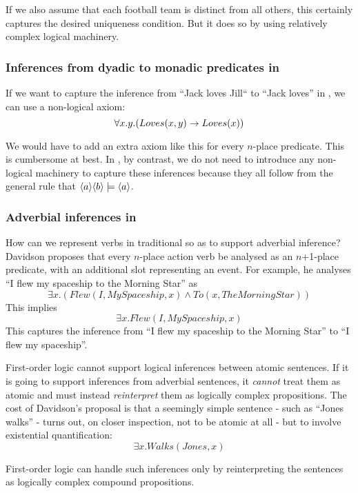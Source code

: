 \NI If we also assume that each football team is distinct from all 
others, this certainly captures the desired uniqueness condition.  But
it does so by using relatively complex logical machinery.



\subsubsection{Inferences from dyadic to monadic predicates in \fol{}}
If we want to capture the inference from ``Jack loves Jill`` to ``Jack
loves'' in \fol{}, we can use a non-logical axiom:
\[
   \forall x. y .( Loves(x,y) \rightarrow Loves(x))
\]

\NI We would have to add an extra  axiom like this for every
$n$-place predicate.  This is cumbersome at best.  In \cathoristic{}, by
contrast, we do not need to introduce any non-logical machinery 
to capture these inferences because they all follow from the general
rule that $\MAY{a} \MAY{b} \models \MAY{a}$.

\subsubsection{Adverbial inferences in \fol{}}

\NI How can we represent verbs in traditional \fol{} so as to
support adverbial inference?  Davidson \cite{davidson2} proposes that
every $n$-place action verb be analysed as an $n$+1-place predicate,
with an additional slot representing an event.  For example, he
analyses ``I flew my spaceship to the Morning Star'' as
\[
\exists x. ( Flew(I, MySpaceship, x) \land To(x, TheMorningStar))
\]
This implies 
\[
\exists x.  Flew(I, MySpaceship, x)
\]
This captures the inference from ``I flew my spaceship to the Morning
Star'' to ``I flew my spaceship''.

First-order logic cannot support logical inferences between atomic
sentences.  If it is going to support inferences from adverbial
sentences, it \emph{cannot} treat them as atomic and must instead
\emph{reinterpret} them as logically complex propositions.  The cost
of Davidson's proposal is that a seemingly simple sentence - such as
``Jones walks'' - turns out, on closer inspection, not to be atomic at
all - but to involve existential quantification:
\[
\exists x.  Walks(Jones, x)
\]

\NI First-order logic can handle such inferences only by
reinterpreting the sentences as logically complex compound
propositions.

